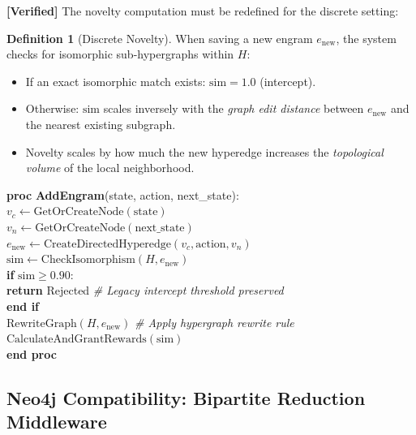 \documentclass[11pt]{article}
\newcommand{\verified}{\textcolor{verifiedgreen}{\textbf{[Verified]}}}
\theoremstyle{definition}
\newtheorem{definition}{Definition}[section]
\theoremstyle{remark}
\begin{document}
\verified{} The novelty computation must be redefined for the discrete setting:

\begin{definition}[Discrete Novelty]
\label{def:discrete-novelty}
When saving a new engram $e_{\text{new}}$, the system checks for isomorphic
sub-hypergraphs within $H$:
\begin{itemize}[nosep]
  \item If an exact isomorphic match exists: $\text{sim} = 1.0$ (intercept).
  \item Otherwise: $\text{sim}$ scales inversely with the
    \emph{graph edit distance} between $e_{\text{new}}$ and the nearest
    existing subgraph.
  \item Novelty scales by how much the new hyperedge increases the
    \emph{topological volume} of the local neighborhood.
\end{itemize}
\end{definition}

\begin{pseudocodebox}
\label{alg:add}
\begin{tabbing}
\textbf{proc} \= \textbf{AddEngram}(state, action, next\_state): \\
\> $v_c \gets \text{GetOrCreateNode}(\text{state})$ \\
\> $v_n \gets \text{GetOrCreateNode}(\text{next\_state})$ \\
\> $e_{\text{new}} \gets \text{CreateDirectedHyperedge}(v_c, \text{action}, v_n)$ \\
\> $\text{sim} \gets \text{CheckIsomorphism}(H, e_{\text{new}})$ \\
\> \textbf{if} $\text{sim} \geq 0.90$: \\
\> \textbf{return} Rejected \hfill\textit{\# Legacy intercept threshold preserved} \\
\> \textbf{end if} \\
\> $\text{RewriteGraph}(H, e_{\text{new}})$ \hfill\textit{\# Apply hypergraph rewrite rule} \\
\> $\text{CalculateAndGrantRewards}(\text{sim})$ \\
\textbf{end proc}
\end{tabbing}
\end{pseudocodebox}

\subsection{Neo4j Compatibility: Bipartite Reduction Middleware}
\end{document}
